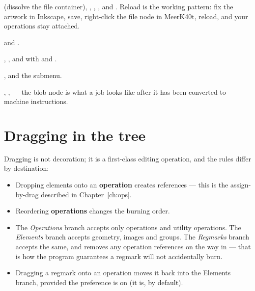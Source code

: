 \begin{description}[leftmargin=1.4em]
  \item[File node]  (dissolve the file container),
        , , , and
        . Reload
        is the working pattern: fix the artwork in Inkscape, save, right-click the
        file node in MeerK40t, reload, and your operations stay attached.
  \item[Regmarks branch]  and
        .
  \item[Regmark element] , ,
        and  with  and
        .
  \item[Elements branch] ,  and the  submenu.
  \item[Blob] , ,
         --- the blob node is what a job looks like after
        it has been converted to machine instructions.
\end{description}

\section{Dragging in the tree}

Dragging is not decoration; it is a first-class editing operation, and the rules
differ by destination:

\begin{itemize}
  \item Dropping elements onto an \textbf{operation} creates references --- this
        is the assign-by-drag described in Chapter~\ref{ch:ops}.
  \item Reordering \textbf{operations} changes the burning order.
  \item The \emph{Operations} branch accepts only operations and utility
        operations. The \emph{Elements} branch accepts geometry, images and
        groups. The \emph{Regmarks} branch accepts the same, and removes any
        operation references on the way in --- that is how the program guarantees
        a regmark will not accidentally burn.
  \item Dragging a regmark onto an operation moves it back into the Elements
        branch, provided the  preference is on
        (it is, by default).
\end{itemize}

